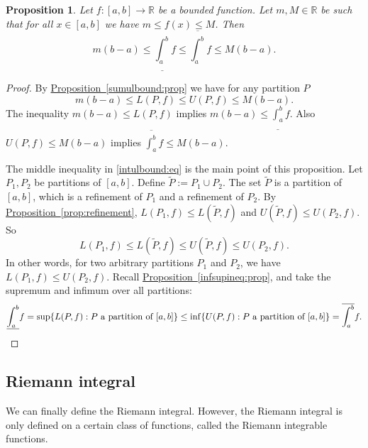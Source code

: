 \documentclass[12pt]{book}
\newcommand{\R}{{\mathbb{R}}}
\theoremstyle{plain}
\newtheorem{prop}[thm]{Proposition}
\theoremstyle{remark}
\theoremstyle{definition}
\theoremstyle{exercise}
\theoremstyle{example}
\newcommand{\propref}[1]{\hyperref[#1]{Proposition~\ref*{#1}}}
\begin{document}
\begin{prop} \label{intulbound:prop}
Let $f \colon [a,b] \to \R$ be a bounded function.  Let $m, M \in \R$ be 
such that for all $x \in [a,b]$ we have $m \leq f(x) \leq M$.  Then
\begin{equation}
\label{intulbound:eq}
m(b-a) \leq
\underline{\int_a^b} f \leq \overline{\int_a^b} f
\leq M(b-a) .
\end{equation}
\end{prop}

\begin{proof}
By \propref{sumulbound:prop} we have for any partition $P$
\begin{equation*}
m(b-a) \leq L(P,f) \leq U(P,f) \leq M(b-a).
\end{equation*}
The inequality
$m(b-a) \leq L(P,f)$ implies $m(b-a) \leq \underline{\int_a^b} f$.
Also
$U(P,f) \leq M(b-a)$ implies $\overline{\int_a^b} f \leq M(b-a)$.

The middle inequality in
\eqref{intulbound:eq} is the main point of this proposition.
Let $P_1, P_2$ be partitions of $[a,b]$.  Define 
$\widetilde{P} := P_1 \cup P_2$.
The set $\widetilde{P}$ is a partition of $[a,b]$, which
is a refinement of $P_1$ and a refinement of $P_2$.
By \propref{prop:refinement},
$L(P_1,f) \leq L(\widetilde{P},f)$ and
$U(\widetilde{P},f) \leq U(P_2,f)$.  So
\begin{equation*}
L(P_1,f) \leq L(\widetilde{P},f) \leq U(\widetilde{P},f) \leq U(P_2,f) .
\end{equation*}
In other words, for two arbitrary partitions $P_1$ and $P_2$, we have
$L(P_1,f) \leq U(P_2,f)$.  
Recall \propref{infsupineq:prop}, and take the supremum and
infimum over all partitions:
\begin{equation*}
\underline{\int_a^b} f = 
\sup \{ L(P,f) : \text{$P$ a partition of $[a,b]$} \}
\leq
\inf \{ U(P,f) : \text{$P$ a partition of $[a,b]$} \}
=
\overline{\int_a^b} f . \qedhere
\end{equation*}
\end{proof}

\subsection{Riemann integral}

We can finally define the Riemann integral.  However, the Riemann
integral is only defined on a certain class of functions, called the
Riemann integrable functions.
\end{document}
